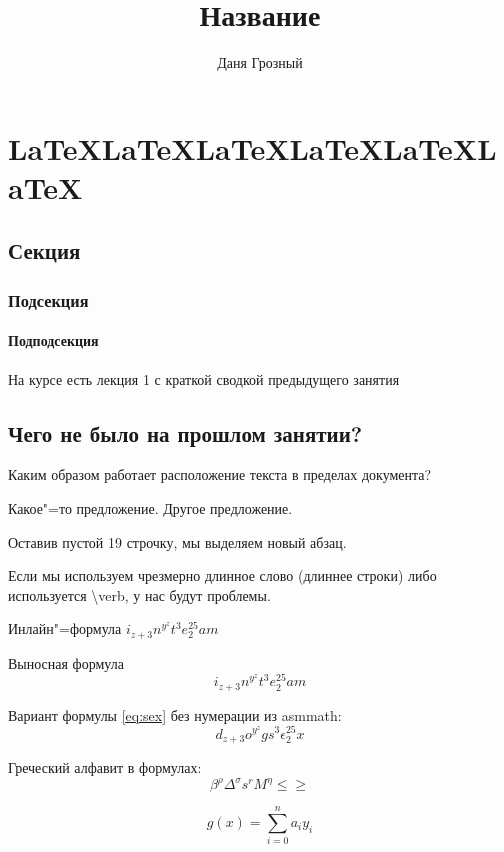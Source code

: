 \documentclass{book}
\title{Название}
\author{Даня Грозный}
\begin{document}
    \chapter{\LaTeX\LaTeX\LaTeX\LaTeX\LaTeX\LaTeX}
    \section{Секция}
    \subsection{Подсекция}
    \subsubsection{Подподсекция}
    \par На курсе есть лекция 1 с краткой сводкой предыдущего занятия
    \section{Чего не было на прошлом занятии?}

    Каким образом работает расположение текста в пределах документа?

    Какое"=то предложение. Другое предложение.

    Оставив пустой 19 строчку, мы выделяем новый абзац.

    Если мы используем чрезмерно длинное слово (длиннее строки) либо используется \textbackslash verb, у нас будут проблемы.

    Инлайн"=формула $i_{z + 3}n^{y^z}t^3e^{25}_2am$

    Выносная формула
    \begin{equation}
        \label{eq:sex}
        i_{z + 3}n^{y^z}t^3e^{25}_2am
    \end{equation}

    Вариант формулы \ref{eq:sex} без нумерации из asmmath:
    \begin{equation*}
        d_{z + 3}o^{y^z}gs^3\epsilon^{25}_2x
    \end{equation*}

    Греческий алфавит в формулах:
    \begin{equation}
        \beta^\rho\Delta^\sigma s^rM^\eta \leq  \geq
    \end{equation}

    \begin{equation}
        g(x) = \sum_{i = 0}^n a_i y_i
    \end{equation}
\end{document}
